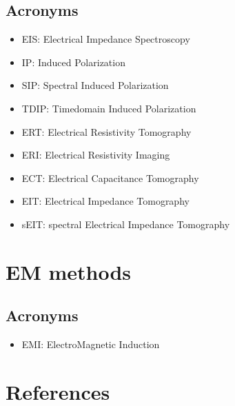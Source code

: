 \documentclass[letterpaper,10pt,english]{sphinxmanual}
\begin{document}
\subsection{Acronyms}
\label{\detokenize{glossary:acronyms}}
\begin{itemize}
\item {} 
EIS: Electrical Impedance Spectroscopy

\item {} 
IP: Induced Polarization

\item {} 
SIP: Spectral Induced Polarization

\item {} 
TDIP: Time\sphinxhyphen{}domain Induced Polarization

\end{itemize}

\begin{itemize}
\item {} 
ERT: Electrical Resistivity Tomography

\item {} 
ERI: Electrical Resistivity Imaging

\item {} 
ECT: Electrical Capacitance Tomography

\item {} 
EIT: Electrical Impedance Tomography

\item {} 
sEIT: spectral Electrical Impedance Tomography

\end{itemize}


\section{EM methods}
\label{\detokenize{glossary:em-methods}}

\subsection{Acronyms}
\label{\detokenize{glossary:id2}}\begin{itemize}
\item {} 
EMI: ElectroMagnetic Induction

\end{itemize}


\section{References}
\label{\detokenize{glossary:references}}
\end{document}
